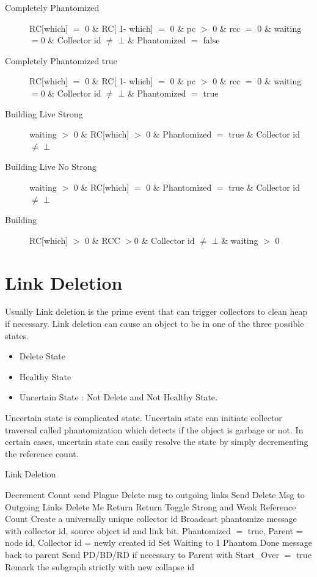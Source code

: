 \documentclass{article}
\begin{document}
\begin{description}
\item[Completely Phantomized] RC[which] $=$ 0 \& RC[ 1- which] $=$ 0 \& pc $>$ 0 \& rcc $=$ 0 \& waiting $=$0 \& Collector id $\neq$ $\bot$ \& Phantomized $=$ false
\item[Completely Phantomized true] RC[which] $=$ 0 \& RC[ 1- which] $=$ 0 \& pc $>$ 0 \& rcc $=$ 0 \& waiting $=$0 \& Collector id $\neq$ $\bot$ \& Phantomized $=$ true
\item[Building Live Strong] waiting $>$ 0 \& RC[which] $>$ 0 \& Phantomized $=$ true \& Collector id $\neq$ $\bot$
\item[Building Live No Strong] waiting $>$ 0 \& RC[which] $=$ 0 \& Phantomized $=$ true \& Collector id $\neq$ $\bot$
   \item[Building] RC[which] $>$ 0 \& RCC $>$0 \& Collector id $\neq$ $\bot$ \& waiting $>$ 0

\end{description}
\section{Link Deletion}
	Usually Link deletion is the prime event that can trigger collectors to clean heap if necessary. Link deletion can cause an object to be in one of the three possible states. 
\begin{itemize}
  \item Delete State
  \item Healthy State
  \item Uncertain State : Not Delete and Not Healthy State.
\end{itemize}
	Uncertain state is complicated state. Uncertain state can initiate collector traversal called phantomization which detects if the object is garbage or not. In certain cases, uncertain state can easily resolve the state by simply decrementing the reference count. 

\begin{algorithm}
\caption{Link Deletion}
\label{Link Deletion}
\begin{algorithmic}[1]
\State Decrement Count
\State send Plague Delete msg to outgoing links
\EndIf
{}
\State Send Delete Msg to Outgoing Links
\State Delete Me
\State Return
\State Return
\State Toggle Strong and Weak Reference Count
\State Create a universally unique collector id
\State Broadcast phantomize message with collector id, source object id and link bit.
\EndFor
\State Phantomized $=$ true, Parent = node id, Collector id = newly created id
\State Set Waiting to 1
\State Phantom Done message back to parent
\EndIf
{}
\State Send PD/BD/RD if necessary to Parent with Start\_Over $=$ true
\State Remark the subgraph strictly with new collapse id 
\EndIf
\EndProcedure
\end{algorithmic}
\end{algorithm}	
\end{document}

